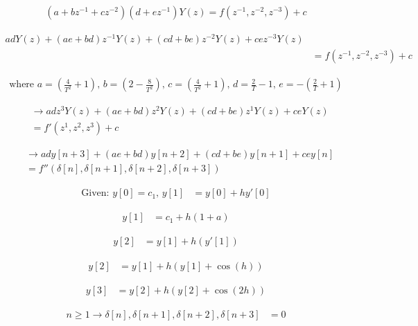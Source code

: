 \documentclass[journal]{IEEEtran}
\begin{document}
	
	\begin{align}
		\left(a + bz^{-1} + cz^{-2}\right) \left(d + ez^{-1}\right) Y(z) = f(z^{-1}, z^{-2}, z^{-3}) + c
	\end{align}
	
	\begin{align}
		adY(z) + (ae+bd)z^{-1}Y(z) + (cd+be)z^{-2}Y(z) + ce z^{-3}Y(z) \nonumber \\
		&= f(z^{-1}, z^{-2}, z^{-3}) + c
	\end{align}
	
	\begin{align}
		\text{where } 
		a = \left(\frac{4}{T^2}+1\right), \, 
		b = \left(2-\frac{8}{T^2}\right), \, 
		c = \left(\frac{4}{T^2}+1\right), \, \nonumber 
		d = \frac{2}{T}-1, \, 
		e = -\left(\frac{2}{T}+1\right)
	\end{align}
	
	\begin{align}
		&\rightarrow 
		adz^{3}Y(z) + (ae+bd)z^{2}Y(z) + (cd+be)z^{1}Y(z) + ceY(z) \nonumber \\
		&= f'(z^{1}, z^{2}, z^{3}) + c
	\end{align}
	
	\begin{align}
		&\rightarrow 
		ady[n+3] + (ae+bd)y[n+2] + (cd+be)y[n+1] + cey[n] \nonumber \\
		&= f''(\delta[n], \delta[n+1], \delta[n+2], \delta[n+3])
	\end{align}
	
	\begin{align}
		\text{Given: } y[0] = c_{1}, \, y[1] &= y[0] + h y'[0]
	\end{align}
	
	\begin{align}
		y[1] &= c_{1} + h(1+a)
	\end{align}
	
	\begin{align}
		y[2] &= y[1] + h(y'[1])
	\end{align}
	
	\begin{align}
		y[2] &= y[1] + h(y[1] + \cos(h))
	\end{align}
	
	\begin{align}
		y[3] &= y[2] + h(y[2] + \cos(2h))
	\end{align}
	
	\begin{align}
		n \geq 1 \rightarrow \delta[n], \delta[n+1], \delta[n+2], \delta[n+3] &= 0
	\end{align}
	
\end{document}
